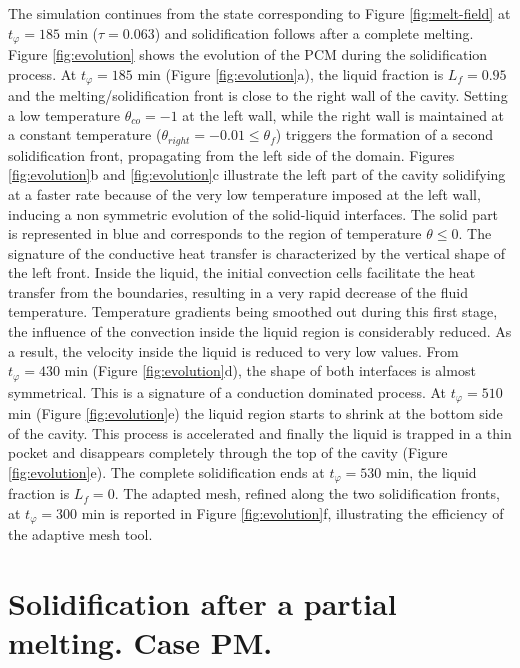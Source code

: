 The simulation continues from the state corresponding to Figure  \ref{fig:melt-field} at $t_{\varphi} =185$ min ($\tau=0.063$) and solidification follows after a complete melting. 
 Figure \ref{fig:evolution} shows the evolution of the PCM during the solidification process. At  $t_{\varphi}  =185$ min     (Figure \ref{fig:evolution}a), the liquid fraction is $L_f=0.95$ and the melting/solidification front is close to the right wall of the cavity. Setting a low temperature $\theta_{co} = -1$ at the left wall, while the right wall is maintained at a constant temperature ($\theta_{right} = -0.01 \leq \theta_f$) triggers the formation of a second solidification front, propagating from the left side of the domain. 
Figures \ref{fig:evolution}b and \ref{fig:evolution}c illustrate the left part of the cavity solidifying at a faster rate because of the very low temperature imposed at the left wall, inducing a non symmetric evolution of the solid-liquid interfaces.
The solid part is represented in blue and corresponds to the region of temperature $\theta \leq 0$.
The signature of the conductive heat transfer is characterized by the vertical shape of the left front.
Inside the liquid, the initial convection cells facilitate the heat transfer from the boundaries, resulting in a very rapid decrease of the fluid temperature. 
Temperature gradients being smoothed out during this first stage, the influence of the convection inside the liquid region is considerably reduced. As a result, the velocity inside the liquid is reduced to very low values. 
From $t_{\varphi} = 430$ min (Figure \ref{fig:evolution}d), the shape of both interfaces is almost symmetrical. 
This is a signature of a conduction dominated process. 
At $t_{\varphi} = 510$ min (Figure \ref{fig:evolution}e) the liquid region starts to shrink at the bottom side of the cavity. This process is accelerated and finally the liquid is trapped in a thin pocket and disappears completely through the top of the cavity (Figure \ref{fig:evolution}e). The complete solidification ends at $t_{\varphi} = 530$ min, \ie the liquid fraction is $L_f=0$.  
The adapted mesh, refined along the two solidification fronts, at $t_{\varphi} = 300$ min is reported in Figure \ref{fig:evolution}f, illustrating the efficiency of the adaptive mesh tool.


\section{Solidification after a partial melting. Case PM.} \label{sec_solid_partial} 

